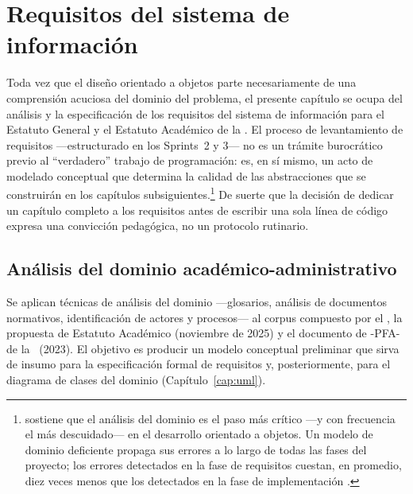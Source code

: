 
\chapter{Requisitos del sistema de información}
\label{cap:requisitos}

\noindent
Toda vez que el diseño orientado a objetos parte necesariamente de una
comprensión acuciosa del dominio del problema, el presente capítulo
se ocupa del análisis y la especificación de los requisitos del sistema
de información para el Estatuto General y el Estatuto Académico de la
\ud. El proceso de levantamiento de requisitos ---estructurado en los
Sprints~2 y 3--- no es un trámite burocrático previo al ``verdadero''
trabajo de programación: es, en sí mismo, un acto de modelado conceptual
que determina la calidad de las abstracciones que se construirán en los
capítulos subsiguientes.\footnote{%
  \textcite{Larman2004} sostiene que el análisis del dominio es el paso
  más crítico ---y con frecuencia el más descuidado--- en el desarrollo
  orientado a objetos. Un modelo de dominio deficiente propaga sus errores
  a lo largo de todas las fases del proyecto; los errores detectados en
  la fase de requisitos cuestan, en promedio, diez veces menos que los
  detectados en la fase de implementación \autocite{Pressman2014}.}
De suerte que la decisión de dedicar un capítulo completo a los requisitos
antes de escribir una sola línea de código expresa una convicción
pedagógica, no un protocolo rutinario.

\section{Análisis del dominio académico-administrativo}
\label{sec:analisis-dominio}

Se aplican técnicas de análisis del dominio ---glosarios, análisis de
documentos normativos, identificación de actores y procesos--- al corpus
compuesto por el \acuerdo, la propuesta de Estatuto Académico (noviembre
de 2025) y el documento de -PFA- de la \ud\ (2023). El objetivo es producir
un modelo conceptual preliminar que sirva de insumo para la especificación
formal de requisitos y, posteriormente, para el diagrama de clases del
dominio (Capítulo~\ref{cap:uml}).

